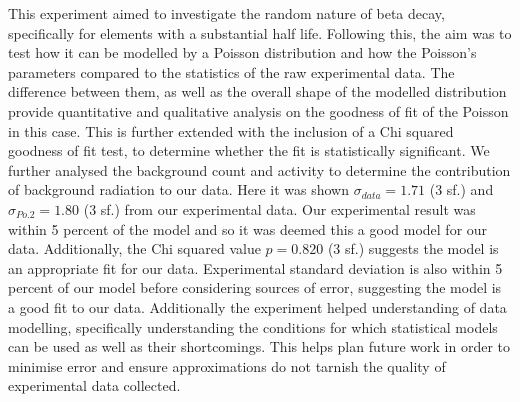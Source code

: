 \documentclass[11pt]{article}
\begin{document}
    This experiment aimed to investigate the random nature of beta decay, specifically for elements with a substantial half life. Following this, the aim was to test how it can be modelled by a Poisson distribution and how the Poisson's parameters compared to the statistics of the raw experimental data. The difference between them, as well as the overall shape of the modelled distribution provide quantitative and qualitative analysis on the goodness of fit of the Poisson in this case. This is further extended with the inclusion of a Chi squared goodness of fit test, to determine whether the fit is statistically significant.  We further analysed the background count and activity to determine the contribution of background radiation to our data. 
    Here it was shown $\sigma_{data} = 1.71$ (3 sf.) and $\sigma_{Po.2} = 1.80$ (3 sf.) from our experimental data. Our experimental result was within 5 percent of the model and so it was deemed this a good model for our data. Additionally, the Chi squared value $p = 0.820$ (3 sf.) suggests the model is an appropriate fit for our data. Experimental standard deviation is also within 5 percent of our model before considering sources of error, suggesting the model is a good fit to our data. 
    Additionally the experiment helped understanding of data modelling, specifically understanding the conditions for which statistical models can be used as well as their shortcomings. This helps plan future work in order to minimise error and ensure approximations do not tarnish the quality of experimental data collected.

    
\end{document}
